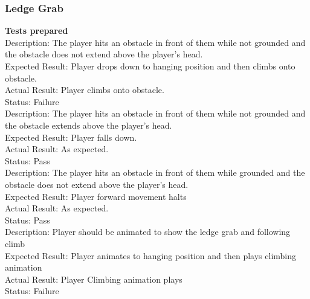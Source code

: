 \documentclass[11pt,a4paper]{article}
\begin{document}
\subsubsection{Ledge Grab}
\textbf{Tests prepared}\\
Description: The player hits an obstacle in front of them while not grounded and the obstacle does not extend above the player's head.\\
Expected Result: Player drops down to hanging position and then climbs onto obstacle.\\
Actual Result: Player climbs onto obstacle.\\
Status: Failure
\smallskip\\
Description: The player hits an obstacle in front of them while not grounded and the obstacle extends above the player's head. \\
Expected Result: Player falls down.\\
Actual Result: As expected.\\
Status: Pass
\smallskip\\
Description: The player hits an obstacle in front of them while grounded and the obstacle does not extend above the player's head. \\
Expected Result: Player forward movement halts\\
Actual Result: As expected.\\
Status: Pass
\smallskip\\
Description: Player should be animated to show the ledge grab and following climb\\
Expected Result: Player animates to hanging position and then plays climbing animation\\
Actual Result: Player Climbing animation plays\\
Status: Failure
\end{document}
